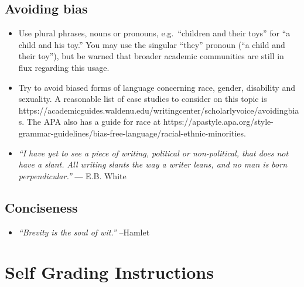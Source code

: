 \documentclass[
  letterpaper,
  DIV=11,
  numbers=noendperiod]{scrreprt}
\providecommand{\tightlist}{%
  \setlength{\itemsep}{0pt}\setlength{\parskip}{0pt}}\usepackage{longtable,booktabs,array}
\begin{document}
\section*{Avoiding bias}\label{avoiding-bias}


\begin{itemize}
\tightlist
\item
  Use plural phrases, nouns or pronouns, e.g.~``children and their
  toys'' for ``a child and his toy.'' You may use the singular ``they''
  pronoun (``a child and their toy''), but be warned that broader
  academic communities are still in flux regarding this usage.
\item
  Try to avoid biased forms of language concerning race, gender,
  disability and sexuality. A reasonable list of case studies to
  consider on this topic is
  https://academicguides.waldenu.edu/writingcenter/scholarlyvoice/avoidingbias.
  The APA also has a guide for race at
  https://apastyle.apa.org/style-grammar-guidelines/bias-free-language/racial-ethnic-minorities.
\item
  \emph{``I have yet to see a piece of writing, political or
  non-political, that does not have a slant. All writing slants the way
  a writer leans, and no man is born perpendicular.''} ― E.B. White
\end{itemize}

\section*{Conciseness}\label{conciseness}


\begin{itemize}
\tightlist
\item
  \emph{``Brevity is the soul of wit.''} --Hamlet
\end{itemize}


\chapter*{Self Grading Instructions}\label{self-grading-instructions}

\end{document}
